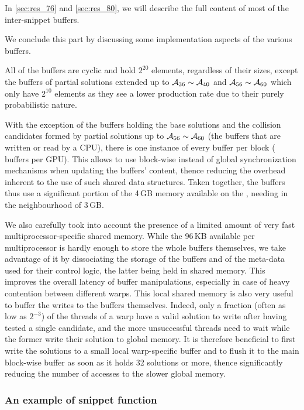 In \autoref{sec:res_76} and \autoref{sec:res_80}, we will describe the full content of most of the inter-snippet buffers.

\bigskip

We conclude this part by discussing some implementation aspects of the various buffers.

All of the buffers are cyclic and hold $2^{20}$ elements, regardless of their sizes, except the buffers of partial solutions extended up to
$\mathcal{A}_{36} \sim \mathcal{A}_{40}$ and $\mathcal{A}_{56} \sim \mathcal{A}_{60}$ which only have $2^{10}$ elements as they see a lower production rate due to their purely probabilistic nature.

With the exception of the buffers holding the base solutions and the collision candidates formed by partial solutions
up to $\mathcal{A}_{56} \sim \mathcal{A}_{60}$ (\ie the buffers that are written or read by a CPU),
there is one instance of every buffer per block ( buffers per GPU). This allows to use block-wise instead of global
synchronization mechanisms when updating the buffers' content,
thence reducing the overhead inherent to the use of such shared data structures.
Taken together, the buffers thus use a significant portion of the 4\,GB memory available on the \gtx, needing in the neighbourhood of 3\,GB.

We also carefully took into account the presence of a limited amount of
very fast multiprocessor-specific shared memory. While the 96\,KB available per multiprocessor is
hardly enough to store the whole buffers themselves, we take advantage of it by dissociating the storage of
the buffers and of the meta-data used for their control logic, the latter being held in
shared memory. This improves the overall latency of buffer manipulations, especially in case of
heavy contention between different warps. This local shared memory is also very useful to buffer
the writes to the buffers themselves. Indeed, only a fraction (often as low as $2^{-3}$)
of the threads of a warp have a valid solution to write after having tested a single candidate,
and the more unsuccessful threads need to wait while the former write their solution to global memory.
It is therefore beneficial to first write the solutions to a small local warp-specific buffer and to
flush it to the main block-wise buffer as soon as it holds 32 solutions or more, thence
significantly reducing the number of accesses to the slower global memory.


\subsubsection{An example of snippet function}
\label{sec:snippet}

